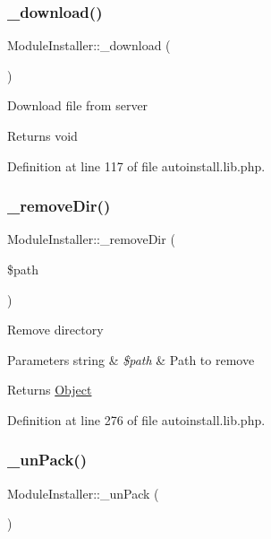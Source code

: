 \subsubsection{\texorpdfstring{\+\_\+download()}{\_download()}}
{\footnotesize\ttfamily Module\+Installer\+::\+\_\+download (\begin{DoxyParamCaption}{ }\end{DoxyParamCaption})}

Download file from server

\begin{DoxyReturn}{Returns}
void 
\end{DoxyReturn}


Definition at line 117 of file autoinstall.\+lib.\+php.

\hypertarget{classModuleInstaller_a1d67a0ab016c393b15df54dabff74e9b}{}\label{classModuleInstaller_a1d67a0ab016c393b15df54dabff74e9b} 
\subsubsection{\texorpdfstring{\+\_\+remove\+Dir()}{\_removeDir()}}
{\footnotesize\ttfamily Module\+Installer\+::\+\_\+remove\+Dir (\begin{DoxyParamCaption}\item[{}]{\$path }\end{DoxyParamCaption})}

Remove directory


\begin{DoxyParams}[1]{Parameters}
string & {\em \$path} & Path to remove \\
\hline
\end{DoxyParams}
\begin{DoxyReturn}{Returns}
\hyperlink{classObject}{Object} 
\end{DoxyReturn}


Definition at line 276 of file autoinstall.\+lib.\+php.

\hypertarget{classModuleInstaller_a4b669f44350c27a508c2aac3180836f6}{}\label{classModuleInstaller_a4b669f44350c27a508c2aac3180836f6} 
\subsubsection{\texorpdfstring{\+\_\+un\+Pack()}{\_unPack()}}
{\footnotesize\ttfamily Module\+Installer\+::\+\_\+un\+Pack (\begin{DoxyParamCaption}{ }\end{DoxyParamCaption})}

